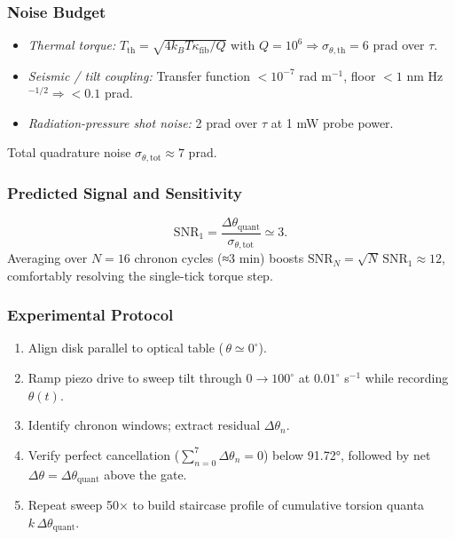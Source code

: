 \documentclass[11pt,oneside]{book}
\begin{document}
\subsubsection{Noise Budget}
\label{ss:torsion-noise}

\begin{itemize}[leftmargin=*,itemsep=2pt]
\item \emph{Thermal torque:}
      $T_{\mathrm{th}}=\sqrt{4k_{\!B}T\kappa_{\mathrm{fib}}/Q}$  
      with $Q=10^{6}\Rightarrow
      \sigma_{\theta,\mathrm{th}}=6$ prad over $\tau$.
\item \emph{Seismic / tilt coupling:}
      Transfer function $<10^{-7}$ rad m$^{-1}$, floor
      $<1$ nm Hz$^{-1/2}\Rightarrow<0.1$ prad.
\item \emph{Radiation-pressure shot noise:}
      2 prad over $\tau$ at 1 mW probe power.
\end{itemize}
Total quadrature noise $\sigma_{\theta,\mathrm{tot}}\approx7$ prad.

\subsubsection{Predicted Signal and Sensitivity}
\label{ss:torsion-signal}

\[
   \mathrm{SNR}_{1} = \frac{\Delta\theta_{\text{quant}}}
                           {\sigma_{\theta,\mathrm{tot}}}
   \simeq 3.
\]
Averaging over $N=16$ chronon cycles (≈3 min) boosts
$\mathrm{SNR}_{N}\!=\!\sqrt{N}\,\mathrm{SNR}_{1}\!\approx\!12$,
comfortably resolving the single-tick torque step.

\subsubsection{Experimental Protocol}
\label{ss:torsion-protocol}

\begin{enumerate}[label=\arabic*.,leftmargin=*,itemsep=3pt]
\item Align disk parallel to optical table (\,$\theta\simeq0^\circ$).
\item Ramp piezo drive to sweep tilt through $0\!\to\!100^\circ$
      at $0.01^\circ$ s$^{-1}$ while recording $\theta(t)$.
\item Identify chronon windows; extract residual $\Delta\theta_{n}$.
\item Verify perfect cancellation
      ($\sum_{n=0}^{7}\!\Delta\theta_{n}=0$) below 91.72°,
      followed by net $\Delta\theta=\Delta\theta_{\text{quant}}$
      above the gate.
\item Repeat sweep 50× to build staircase profile of cumulative
      torsion quanta $k\,\Delta\theta_{\text{quant}}$.
\end{enumerate}
\end{document}
